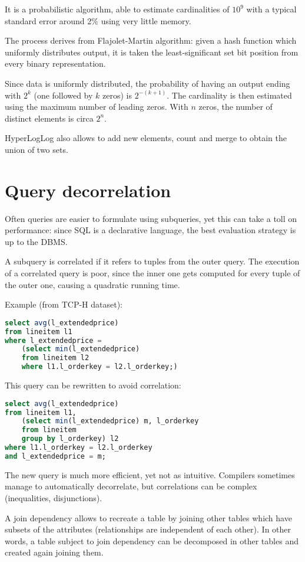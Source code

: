 It is a probabilistic algorithm, able to estimate cardinalities of $10^{9}$ with a typical standard error around 2\% using very little memory. 

The process derives from Flajolet-Martin algorithm: given a hash function which uniformly distributes output, it is taken the least-significant set bit position from every binary representation. 

Since data is uniformly distributed, the probability of having an output ending with $2^k$ (one followed by $k$ zeros) is $2^{-(k+1)}$. The cardinality is then estimated using the maximum number of leading zeros. With $n$ zeros, the number of distinct elements is circa $2^n$.

HyperLogLog also allows to add new elements, count and merge to obtain the union of two sets.

\section{Query decorrelation}
Often queries are easier to formulate using subqueries, yet this can take a toll on performance: since SQL is a declarative language, the best evaluation strategy is up to the DBMS.

A subquery is correlated if it refers to tuples from the outer query. The execution of a correlated query is poor, since the inner one gets computed for every tuple of the outer one, causing a quadratic running time.

Example (from TCP-H dataset):
\begin{lstlisting}[language=SQL]
select avg(l_extendedprice)
from lineitem l1
where l_extendedprice =
	(select min(l_extendedprice)
	from lineitem l2
	where l1.l_orderkey = l2.l_orderkey;)
\end{lstlisting}

This query can be rewritten to avoid correlation:
\begin{lstlisting}[language=SQL]
select avg(l_extendedprice)
from lineitem l1,
	(select min(l_extendedprice) m, l_orderkey
	from lineitem
	group by l_orderkey) l2
where l1.l_orderkey = l2.l_orderkey
and l_extendedprice = m;
\end{lstlisting}

The new query is much more efficient, yet not as intuitive. Compilers sometimes manage to automatically decorrelate, but correlations can be complex (inequalities, disjunctions).

A join dependency allows to recreate a table by joining other tables which have subsets of the attributes (relationships are independent of each other). In other words, a table subject to join dependency can be decomposed in other tables and created again joining them.

